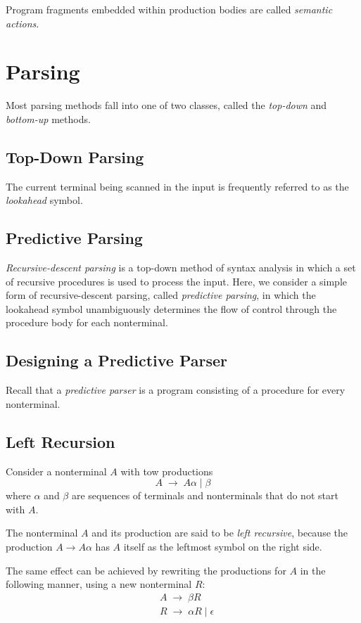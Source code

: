 \documentclass[12pt,a4paper,twoside,openany]{book}
\begin{document}
Program fragments embedded within production bodies are called \textit{semantic actions}.

\section{Parsing}

Most parsing methods fall into one of two classes, called the \textit{top-down} and \textit{bottom-up} methods.

\subsection{Top-Down Parsing}

The current terminal being scanned in the input is frequently referred to as the \textit{lookahead} symbol.

\subsection{Predictive Parsing}

\textit{Recursive-descent parsing} is a top-down method of syntax analysis in which a set of recursive procedures is used to process the input. Here, we consider a simple form of recursive-descent parsing, called \textit{predictive parsing}, in which the lookahead symbol unambiguously determines the flow of control through the procedure body for each nonterminal.

\subsection{Designing a Predictive Parser}

Recall that a \textit{predictive parser} is a program consisting of a procedure for every nonterminal.

\subsection{Left Recursion}

Consider a nonterminal $A$ with tow productions $$A\;\rightarrow\;A\alpha\;|\;\beta$$ where $\alpha$ and $\beta$ are sequences of terminals and nonterminals that do not start with $A$.

The nonterminal $A$ and its production are said to be \textit{left recursive}, because the production $A\to A\alpha$ has $A$ itself as the leftmost symbol on the right side.

The same effect can be achieved by rewriting the productions for $A$ in the following manner, using a new nonterminal $R$:
\begin{align*}
    &A\;\to\;\beta R\\
    &R\;\to\;\alpha R\;|\;\epsilon
\end{align*}
\end{document}
